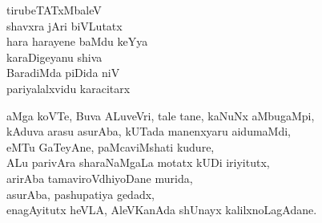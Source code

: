 \begin{entry}
\gl{}
\end{entry}

\begin{entry}
\begin{shl}
tirubeTATxMbaleV\\
shavxra jAri biVLutatx\\
hara harayene baMdu keYya\\
karaDigeyanu shiva\\
BaradiMda piDida niV\\
pariyalalxvidu karacitarx
\end{shl}
\end{entry}

\begin{entry}
\begin{shl}
aMga koVTe, Buva ALuveVri, tale tane, kaNuNx aMbugaMpi,\\
kAduva arasu asurAba, kUTada manenxyaru aidumaMdi,\\
eMTu GaTeyAne, paMcaviMshati kudure,\\
ALu parivAra sharaNaMgaLa motatx kUDi iriyitutx,\\
arirAba tamaviroVdhiyoDane murida,\\
asurAba, pashupatiya gedadx,\\
enagAyitutx heVLA, AleVKanAda shUnayx kalilxnoLagAdane.
\end{shl}
\end{entry}


